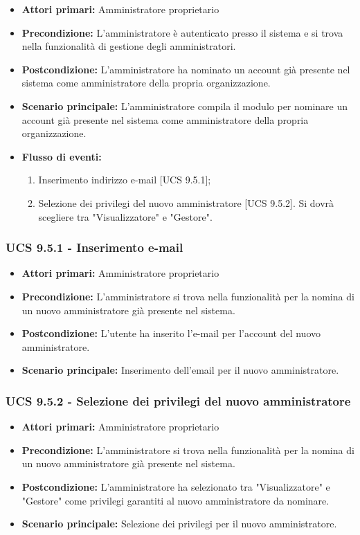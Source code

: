 \begin{itemize}
\item \textbf{Attori primari:} Amministratore proprietario
\item \textbf{Precondizione:} L'amministratore è autenticato presso il sistema e si trova nella funzionalità di gestione degli amministratori.
\item \textbf{Postcondizione:} L'amministratore ha nominato un account già presente nel sistema come amministratore della propria organizzazione.
\item \textbf{Scenario principale:} L'amministratore compila il modulo per nominare un account già presente nel sistema come amministratore della propria organizzazione.
\item \textbf{Flusso di eventi:} %
  \begin{enumerate}
        \item Inserimento indirizzo e-mail [UCS 9.5.1];
        \item Selezione dei privilegi del nuovo amministratore [UCS 9.5.2]. Si dovrà scegliere tra "Visualizzatore" e "Gestore".
    \end{enumerate}
\end{itemize}

\subsubsection{UCS 9.5.1 - Inserimento e-mail}
\begin{itemize}
\item \textbf{Attori primari:} Amministratore proprietario
\item \textbf{Precondizione:} L'amministratore si trova nella funzionalità per la nomina di un nuovo amministratore già presente nel sistema.
\item \textbf{Postcondizione:} L'utente ha inserito l'e-mail per l'account del nuovo amministratore.
\item \textbf{Scenario principale:} Inserimento dell'email per il nuovo amministratore.
\end{itemize}


\subsubsection{UCS 9.5.2 - Selezione dei privilegi del nuovo amministratore}
\begin{itemize}
\item \textbf{Attori primari:} Amministratore proprietario
\item \textbf{Precondizione:} L'amministratore si trova nella funzionalità per la nomina di un nuovo amministratore già presente nel sistema.
\item \textbf{Postcondizione:} L'amministratore ha selezionato tra "Visualizzatore" e "Gestore" come privilegi garantiti al nuovo amministratore da nominare.
\item \textbf{Scenario principale:} Selezione dei privilegi per il nuovo amministratore.
\end{itemize}
